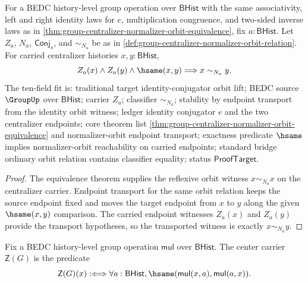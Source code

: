 \begin{theorem}
\label{thm:group-centralizer-normalizer-orbit-hsame-lift}
For a BEDC history-level group operation over $\mathsf{BHist}$ with the same
associativity, left and right identity laws for $e$, multiplication
congruence, and two-sided inverse laws as in
\autoref{thm:group-centralizer-normalizer-orbit-equivalence}, fix
$a:\mathsf{BHist}$. Let $Z_a$, $N_a$, $\mathsf{Conj}_s$, and $\sim_{N_a}$ be
as in \autoref{def:group-centralizer-normalizer-orbit-relation}. For carried
centralizer histories $x,y:\mathsf{BHist}$,
$$
Z_a(x)\land Z_a(y)\land \hsame(x,y)\Longrightarrow x\sim_{N_a}y.
$$
The ten-field fit is: traditional target identity-conjugator orbit lift; BEDC
source $\GroupUp$ over $\mathsf{BHist}$; carrier $Z_a$; classifier
$\sim_{N_a}$; stability by endpoint transport from the identity orbit witness;
ledger identity conjugator $e$ and the two centralizer endpoints; core theorem
list \autoref{thm:group-centralizer-normalizer-orbit-equivalence} and
normalizer-orbit endpoint transport; exactness
predicate $\hsame$ implies normalizer-orbit reachability on carried endpoints;
standard bridge ordinary orbit relation contains classifier equality; status
$\mathsf{ProofTarget}$.
\end{theorem}
\begin{proof}
The equivalence theorem supplies the reflexive orbit witness
$x\sim_{N_a}x$ on the centralizer carrier. Endpoint transport for the same
orbit relation keeps the source endpoint fixed and moves the target endpoint
from $x$ to $y$ along the given $\hsame(x,y)$ comparison. The carried
endpoint witnesses $Z_a(x)$ and $Z_a(y)$ provide the transport hypotheses, so
the transported witness is exactly $x\sim_{N_a}y$.
\end{proof}

\begin{definition}
\label{def:group-center-carrier}
Fix a BEDC history-level group operation $\mathsf{mul}$ over $\mathsf{BHist}$.
The center carrier $\mathsf{Z}(G)$ is the predicate
$$
\mathsf{Z}(G)(x) :\Longleftrightarrow
\forall a:\mathsf{BHist},
\hsame(\mathsf{mul}(x,a),\mathsf{mul}(a,x)).
$$
\end{definition}

